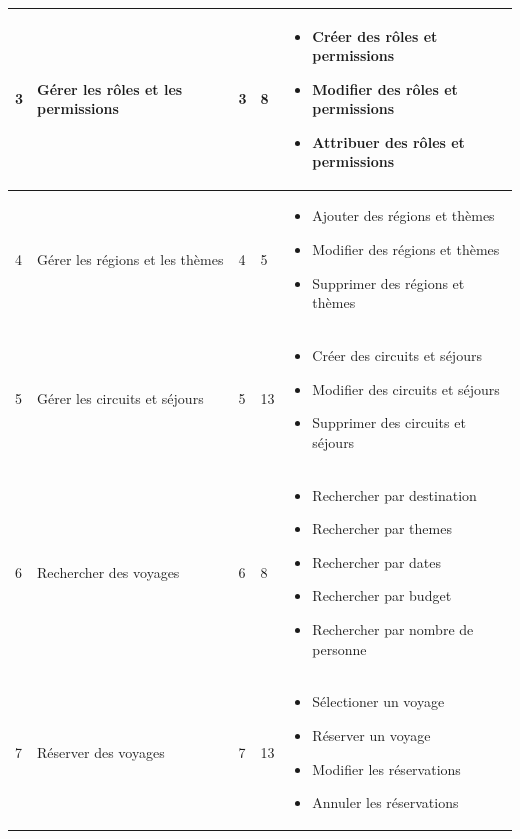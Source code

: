 \documentclass[12pt]{report}
\begin{document}
\begin{longtable}{|p{1cm}|p{3cm}|p{2cm}|p{2cm}|p{6cm}|}
						\hline
						 3&Gérer les rôles et les permissions&3&8&
						\begin{itemize}
							\item Créer des rôles et permissions
							 \item Modifier des rôles et permissions
							 \item Attribuer des rôles et permissions
						\end{itemize}
						\\
						\hline
						 4&Gérer les régions et les thèmes&4&5&
						\begin{itemize}
							\item Ajouter des régions et thèmes
							\item	Modifier des régions et thèmes						
							\item Supprimer des régions et thèmes
						\end{itemize}
						\\
						\hline
						 5&Gérer les circuits et séjours&5&13&
						\begin{itemize}
							\item Créer des circuits et séjours
							\item Modifier des circuits et séjours
							\item Supprimer des circuits et séjours
						\end{itemize}
						\\
						\hline
						 6&Rechercher des voyages&6&8&
						\begin{itemize}
							\item Rechercher par destination
							\item Rechercher par themes
							\item Rechercher par dates
							\item Rechercher par budget
							\item Rechercher par nombre de personne
						\end{itemize}
						\\
						\hline
						 7&Réserver des voyages&7&13&
						\begin{itemize}
							\item Sélectioner un voyage
							\item Réserver un voyage
							\item Modifier les réservations
							\item Annuler les réservations
						\end{itemize}
						\\

\end{longtable}
\end{document}
